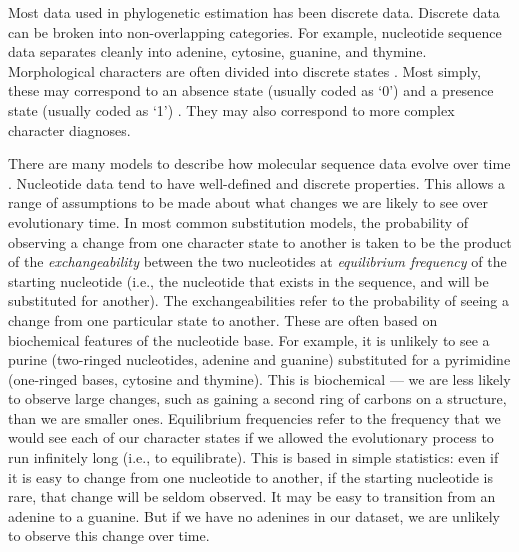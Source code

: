 Most data used in phylogenetic estimation has been discrete data.
Discrete data can be broken into non-overlapping categories.
For example, nucleotide sequence data separates cleanly into adenine, cytosine, guanine, and thymine.
Morphological characters are often divided into discrete states \citep{de1985ontogenetic}.
Most simply, these may correspond to an absence state (usually coded as `0') and a presence state (usually coded as `1') \citep{watrous1981}.
They may also correspond to more complex character diagnoses.

There are many models to describe how molecular sequence data evolve over time \citep{Jukes1969, Kimura1980, Felsenstein1981, Hasegawa1985, Tavare1986}.
Nucleotide data tend to have well-defined and discrete properties.
This allows a range of assumptions to be made about what changes we are likely to see over evolutionary time.
In most common substitution models, the probability of observing a change from one character state to another is taken to be the product of the \textit{exchangeability} between the two nucleotides at \textit{equilibrium frequency} of the starting nucleotide (i.e., the nucleotide that exists in the sequence, and will be substituted for another). 
The exchangeabilities refer to the probability of seeing a change from one particular state to another.
These are often based on biochemical features of the nucleotide base.
For example, it is unlikely to see a purine (two-ringed nucleotides, adenine and guanine) substituted for a pyrimidine (one-ringed bases, cytosine and thymine). 
This is biochemical --- we are less likely to observe large changes, such as gaining a second ring of carbons on a structure, than we are smaller ones.
Equilibrium frequencies refer to the frequency that we would see each of our character states if we allowed the evolutionary process to run infinitely long (i.e., to equilibrate).
This is based in simple statistics: even if it is easy to change from one nucleotide to another, if the starting nucleotide is rare, that change will be seldom observed.
It may be easy to transition from an adenine to a guanine.
But if we have no adenines in our dataset, we are unlikely to observe this change over time.

